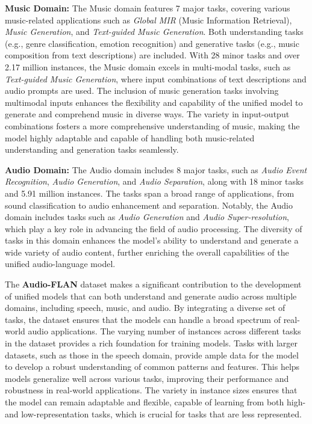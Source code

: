\textbf{Music Domain:} The Music domain features 7 major tasks, covering various music-related applications such as \textit{Global MIR} (Music Information Retrieval), \textit{Music Generation}, and \textit{Text-guided Music Generation}. Both understanding tasks (e.g., genre classification, emotion recognition) and generative tasks (e.g., music composition from text descriptions) are included. With 28 minor tasks and over 2.17 million instances, the Music domain excels in multi-modal tasks, such as \textit{Text-guided Music Generation}, where input combinations of text descriptions and audio prompts are used. The inclusion of music generation tasks involving multimodal inputs enhances the flexibility and capability of the unified model to generate and comprehend music in diverse ways. The variety in input-output combinations fosters a more comprehensive understanding of music, making the model highly adaptable and capable of handling both music-related understanding and generation tasks seamlessly.

\textbf{Audio Domain:} The Audio domain includes 8 major tasks, such as \textit{Audio Event Recognition}, \textit{Audio Generation}, and \textit{Audio Separation}, along with 18 minor tasks and 5.91 million instances. The tasks span a broad range of applications, from sound classification to audio enhancement and separation. Notably, the Audio domain includes tasks such as \textit{Audio Generation} and \textit{Audio Super-resolution}, which play a key role in advancing the field of audio processing. The diversity of tasks in this domain enhances the model’s ability to understand and generate a wide variety of audio content, further enriching the overall capabilities of the unified audio-language model.

The \textbf{Audio-FLAN} dataset makes a significant contribution to the development of unified models that can both understand and generate audio across multiple domains, including speech, music, and audio. By integrating a diverse set of tasks, the dataset ensures that the models can handle a broad spectrum of real-world audio applications. The varying number of instances across different tasks in the dataset provides a rich foundation for training models. Tasks with larger datasets, such as those in the speech domain, provide ample data for the model to develop a robust understanding of common patterns and features. This helps models generalize well across various tasks, improving their performance and robustness in real-world applications. The variety in instance sizes ensures that the model can remain adaptable and flexible, capable of learning from both high- and low-representation tasks, which is crucial for tasks that are less represented.

